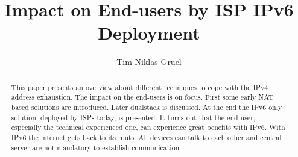\documentclass[format=sigconf, natbib=true, nonacm=true]{acmart}
\begin{document}
    \title{Impact on End-users by ISP IPv6 Deployment}

    \author{Tim Niklas Gruel}

    \begin{abstract}
        This paper presents an overview about different techniques to cope with the IPv4 address exhaustion. The impact on the end-users is on focus. First some early NAT based solutions are introduced. Later dualstack is discussed. At the end the IPv6 only solution, deployed by ISPs today, is presented. It turns out that the end-user, especially the technical experienced one, can experience great benefits with IPv6. With IPv6 the internet gets back to its routs. All devices can talk to each other and central server are not mandatory to establish communication.
    \end{abstract}



    \maketitle
\end{document}
